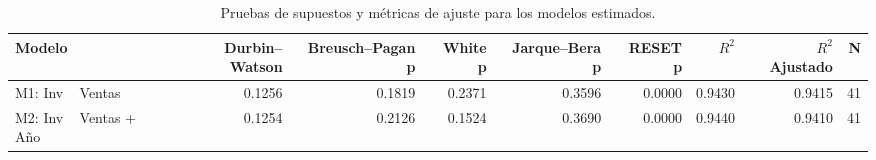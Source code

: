 \begin{table}
\caption{Pruebas de supuestos y métricas de ajuste para los modelos estimados.}
\label{tab:ex8_diagnosticos}
\begin{tabular}{lrrrrrrrr}
\toprule
Modelo & Durbin–Watson & Breusch–Pagan p & White p & Jarque–Bera p & RESET p & $R^2$ & $R^2$ Ajustado & N \\
\midrule
M1: Inv ~ Ventas & 0.1256 & 0.1819 & 0.2371 & 0.3596 & 0.0000 & 0.9430 & 0.9415 & 41 \\
M2: Inv ~ Ventas + Año & 0.1254 & 0.2126 & 0.1524 & 0.3690 & 0.0000 & 0.9440 & 0.9410 & 41 \\
\bottomrule
\end{tabular}
\end{table}
